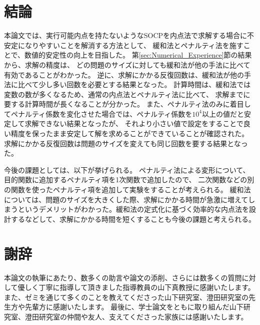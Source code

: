 \documentclass[11pt,a4paper,dvipdfmx,titlepage,uplatex]{jsarticle}
\theoremstyle{mystyle}
\newcommand{\red}[1]{\begin{color}{red}#1\end{color}}
\newcommand{\0}{\mathbf{0}}
\begin{document}
\clearpage

\section{結論}\label{sec:Conclusion}
本論文では、実行可能内点を持たないようなSOCPを内点法で求解する場合に不安定になりやすいことを解消する方法として、
緩和法とペナルティ法を施すことで、数値的安定性の向上を目指した。
第\ref{sec:Numerical_Experience}節の結果から、求解の精度は、
どの問題のサイズに対しても緩和法が他の手法に比べて有効であることがわかった。
逆に、求解にかかる反復回数は、緩和法が他の手法に比べて少し多い回数を必要とする結果となった。
計算時間は、緩和法では変数の数が多くなるため、通常の内点法とペナルティ法に比べて、
求解までに要する計算時間が長くなることが分かった。
また、ペナルティ法のみに着目してペナルティ係数を変化させた場合では、ペナルティ係数を$10^4$以上の値だと安定して求解できない結果となったが、
それより小さい値で設定をすることで良い精度を保ったまま安定して解を求めることができていることが確認された。
求解にかかる反復回数は問題のサイズを変えても同じ回数を要する結果となった。

今後の課題としては、以下が挙げられる。
ペナルティ法による変形について、目的関数に追加するペナルティ項を1次関数で追加したので、
二次関数などの別の関数を使ったペナルティ項を追加して実験をすることが考えられる。
緩和法については、問題のサイズを大きくした際、求解にかかる時間が急激に増えてしまうというデメリットがわかった。緩和法の定式化に基づく効率的な内点法を設計するなどして、求解にかかる時間を短くすることも今後の課題と考えられる。


\clearpage
\section*{謝辞}\label{sec:Acknowledgement}

本論文の執筆にあたり、数多くの助言や論文の添削、さらには数多くの質問に対して優しく丁寧に指導して頂きました指導教員の山下真教授に感謝いたします。
また、ゼミを通じて多くのことを教えてくださった山下研究室、澄田研究室の先生方や先輩方に感謝いたします。
最後に、学士論文をともに取り組んだ山下研究室、澄田研究室の仲間や友人、支えてくださった家族には感謝いたします。


\clearpage
\begin{small}

\end{small}
\end{document}
